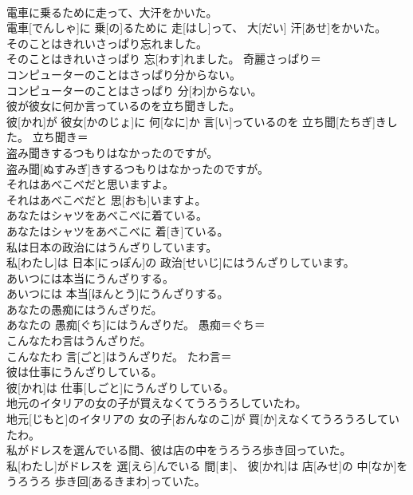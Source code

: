 \documentclass[8pt]{extreport}
\begin{document}
\begin{CJK}{UTF8}{min}
\\	電車に乗るために走って、大汗をかいた。	
\\	電車[でんしゃ]に 乗[の]るために 走[はし]って、 大[だい] 汗[あせ]をかいた。	
\\	そのことはきれいさっぱり忘れました。	
\\	そのことはきれいさっぱり 忘[わす]れました。	奇麗さっぱり＝ 
\\	コンピューターのことはさっぱり分からない。	
\\	コンピューターのことはさっぱり 分[わ]からない。	
\\	彼が彼女に何か言っているのを立ち聞きした。	
\\	彼[かれ]が 彼女[かのじょ]に 何[なに]か 言[い]っているのを 立ち聞[たちぎ]きした。	立ち聞き＝ 
\\	盗み聞きするつもりはなかったのですが。	
\\	盗み聞[ぬすみぎ]きするつもりはなかったのですが。	
\\	それはあべこべだと思いますよ。	
\\	それはあべこべだと 思[おも]いますよ。	
\\	あなたはシャツをあべこべに着ている。	
\\	あなたはシャツをあべこべに 着[き]ている。	
\\	私は日本の政治にはうんざりしています。	
\\	私[わたし]は 日本[にっぽん]の 政治[せいじ]にはうんざりしています。	
\\	あいつには本当にうんざりする。	
\\	あいつには 本当[ほんとう]にうんざりする。	
\\	あなたの愚痴にはうんざりだ。	
\\	あなたの 愚痴[ぐち]にはうんざりだ。	愚痴＝ぐち＝ 
\\	こんなたわ言はうんざりだ。	
\\	こんなたわ 言[ごと]はうんざりだ。	たわ言＝ 
\\	彼は仕事にうんざりしている。	
\\	彼[かれ]は 仕事[しごと]にうんざりしている。	
\\	地元のイタリアの女の子が買えなくてうろうろしていたわ。	
\\	地元[じもと]のイタリアの 女の子[おんなのこ]が 買[か]えなくてうろうろしていたわ。	
\\	私がドレスを選んでいる間、彼は店の中をうろうろ歩き回っていた。	
\\	私[わたし]がドレスを 選[えら]んでいる 間[ま]、 彼[かれ]は 店[みせ]の 中[なか]をうろうろ 歩き回[あるきまわ]っていた。	

\end{CJK}
\end{document}
